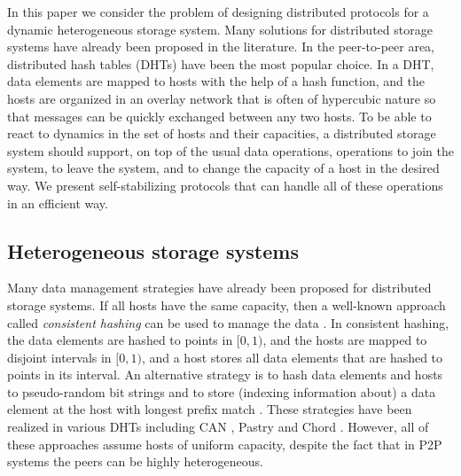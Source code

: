 \documentclass[11pt]{article}
\begin{document}
In this paper we consider the problem of designing distributed protocols for a
dynamic heterogeneous storage system. Many solutions for distributed storage
systems have already been proposed in the literature. In the peer-to-peer
area, distributed hash tables (DHTs) have been the most popular choice. In a
DHT, data elements are mapped to hosts with the help of a hash function, and
the hosts are organized in an overlay network that is often of hypercubic
nature so that messages can be quickly exchanged between any two hosts. To be
able to react to dynamics in the set of hosts and their capacities, a
distributed storage system should support, on top of the usual data
operations, operations to join the system, to leave the system, and to change
the capacity of a host in the desired way. We present self-stabilizing
protocols that can handle all of these operations in an efficient way.


\subsection{Heterogeneous storage systems}

Many data management strategies have already been proposed for distributed
storage systems. If all hosts have the same capacity, then a well-known
approach called {\em consistent hashing} can be used to manage the data
\cite{conhash}. In consistent hashing, the data elements are hashed to points
in $[0,1)$, and the hosts are mapped to disjoint intervals in $[0,1)$, and a
host stores all data elements that are hashed to points in its interval. An
alternative strategy is to hash data elements and hosts to pseudo-random bit
strings and to store (indexing information about) a data element at the host
with longest prefix match \cite{Plaxton}. These strategies have been realized
in various DHTs including CAN \cite{RF+01:can}, Pastry \cite{RD01:pastry} and
Chord \cite{SM+01:chord}. However, all of these approaches assume hosts of
uniform capacity, despite the fact that in P2P systems the peers can be highly
heterogeneous.
\end{document}
